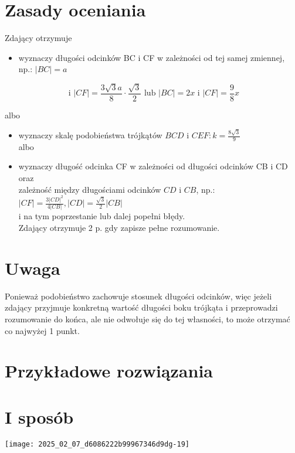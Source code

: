 \documentclass[10pt]{article}
\begin{document}
\section*{Zasady oceniania}
Zdający otrzymuje

\begin{itemize}
  \item wyznaczy długości odcinków BC i CF w zależności od tej samej zmiennej, np.: $|B C|=a$
\end{itemize}

$$
\text { i }|C F|=\frac{3 \sqrt{3} a}{8} \cdot \frac{\sqrt{3}}{2} \text { lub }|B C|=2 x \text { i }|C F|=\frac{9}{8} x
$$

albo

\begin{itemize}
  \item wyznaczy skalę podobieństwa trójkątów $B C D$ i $C E F: k=\frac{8 \sqrt{3}}{9}$\\
albo
  \item wyznaczy długość odcinka CF w zależności od długości odcinków CB i CD oraz\\
zależność między długościami odcinków $C D$ i $C B$, np.: $|C F|=\frac{3|C D|^{2}}{4|C B|},|C D|=\frac{\sqrt{3}}{2}|C B|$\\
i na tym poprzestanie lub dalej popełni błędy.\\
Zdający otrzymuje 2 p. gdy zapisze pełne rozumowanie.
\end{itemize}

\section*{Uwaga}
Ponieważ podobieństwo zachowuje stosunek długości odcinków, więc jeżeli zdający przyjmuje konkretną wartość długości boku trójkąta i przeprowadzi rozumowanie do końca, ale nie odwołuje się do tej własności, to może otrzymać co najwyżej 1 punkt.

\section*{Przykładowe rozwiązania}
\section*{I sposób}
\begin{center}
\texttt{[image: 2025\_02\_07\_d6086222b99967346d9dg-19]}
\end{center}
\end{document}
